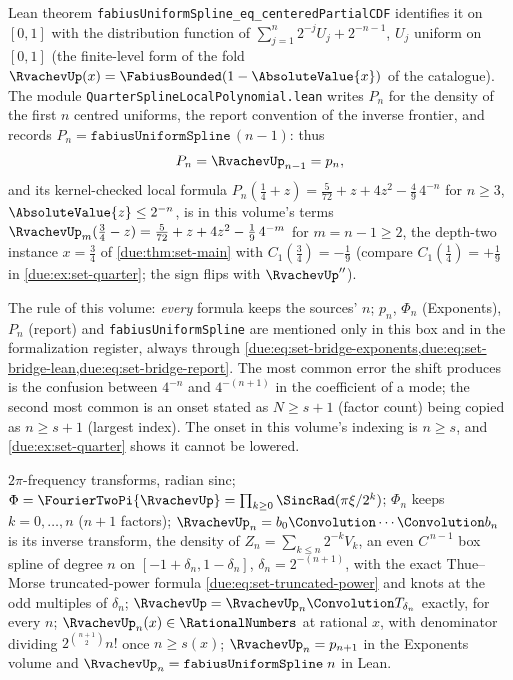\documentclass[11pt,oneside]{article}
\theoremstyle{plain}
\theoremstyle{definition}
\theoremstyle{remark}
\newcommand{\Kk}{\RationalNumbers}                          %
\newcommand{\upn}[1]{\RvachevUp_{#1}}
\newcommand{\Phin}[1]{\Phi_{#1}}                            %
\newcommand{\PhiUp}{\Phi}                                   %
\newcommand{\dep}[1]{s\!\left(#1\right)}                    %
\newcommand{\Cr}[2]{C_{#1}\!\left(#2\right)}                %
\begin{document}
\begin{warningbox}[title={One spline, three indexings}]
\begin{itemize}
      Lean theorem
      \texttt{fabiusUniformSpline\_\allowbreak eq\_\allowbreak centeredPartialCDF}
      identifies it on $[0,1]$ with the distribution function of
      $\sum_{j=1}^{n}2^{-j}U_j+2^{-n-1}$, $U_j$ uniform on $[0,1]$ (the
      finite-level form of the fold $\RvachevUp(x)=\FabiusBounded(1-\AbsoluteValue{x})$
      of the catalogue).  The module
      \texttt{QuarterSplineLocalPolynomial.\allowbreak lean} writes $P_n$
      for the density of the first $n$ centred uniforms, the
      report convention of the inverse frontier, and records
      $P_n=\mathtt{fabiusUniformSpline}\,(n-1)$: thus
      \begin{equation}
       P_n=\upn{n-1}=p_n,
       \label{due:eq:set-bridge-report}
      \end{equation}
      and its kernel-checked local formula
      $P_n(\tfrac14+z)=\tfrac{5}{72}+z+4z^{2}-\tfrac49\,4^{-n}$ for
      $n\ge3$, $\AbsoluteValue{z}\le2^{-n}$, is in this volume's terms
      $\upn{m}(\tfrac34-z)=\tfrac5{72}+z+4z^{2}-\tfrac19\,4^{-m}$ for
      $m=n-1\ge2$, the depth-two instance $x=\frac34$ of
      \cref{due:thm:set-main} with $\Cr{1}{\frac34}=-\frac19$ (compare
      $\Cr{1}{\frac14}=+\frac19$ in \cref{due:ex:set-quarter}; the sign
      flips with $\RvachevUp''$).
\end{itemize}
The rule of this volume: \emph{every} formula keeps the sources' $n$;
$p_n$, $\Phi_n$ (Exponents), $P_n$ (report) and
\texttt{fabiusUniformSpline} are mentioned only in this box and in the
formalization register, always through
\cref{due:eq:set-bridge-exponents,due:eq:set-bridge-lean,due:eq:set-bridge-report}.
The most common error the shift produces is the confusion between
$4^{-n}$ and $4^{-(n+1)}$ in the coefficient of a mode; the second most
common is an onset stated as $N\ge s+1$ (factor count) being copied as
$n\ge s+1$ (largest index).  The onset in this volume's indexing is
$n\ge s$, and \cref{due:ex:set-quarter} shows it cannot be lowered.
\end{warningbox}

\begin{summarybox}[title={Setting, in five lines}]
$2\pi$-frequency transforms, radian sinc; $\PhiUp=\FourierTwoPi{\RvachevUp}
=\prod_{k\ge0}\SincRad(\pi\xi/2^{k})$; $\Phin{n}$ keeps $k=0,\ldots,n$
($n+1$ factors); $\upn{n}=b_0\Convolution\cdots\Convolution b_n$ is its
inverse transform, the density of $Z_n=\sum_{k\le n}2^{-k}V_k$, an even
$C^{\,n-1}$ box spline of degree $n$ on $[-1+\delta_n,1-\delta_n]$,
$\delta_n=2^{-(n+1)}$, with the exact Thue--Morse truncated-power formula
\cref{due:eq:set-truncated-power} and knots at the odd multiples of
$\delta_n$; $\RvachevUp=\upn{n}\Convolution T_{\delta_n}$ exactly, for every
$n$; $\upn{n}(x)\in\Kk$ at rational $x$, with denominator dividing
$2^{\binom{n+1}{2}}n!$ once $n\ge\dep{x}$; $\upn{n}=p_{n+1}$ in the
Exponents volume and $\upn{n}=\mathtt{fabiusUniformSpline}\;n$ in Lean.
\end{summarybox}
\end{document}
